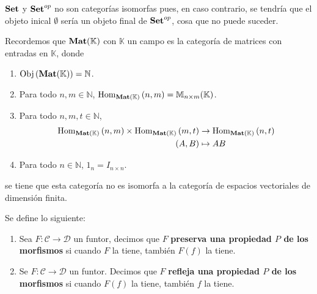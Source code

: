 \documentclass[12pt]{report}
\newcounter{it}
\theoremstyle{largebreak}
\newcommand\cf[3]{\ensuremath{#1:#2\rightarrow#3}}
\newcommand{\Obj}[1]{\ensuremath{\textup{Obj}\left(#1\right)}}
\newcommand{\Hom}[3]{\ensuremath{\textup{Hom}_{#1}\left(#2,#3\right)}}
\newcommand{\Cat}[1]{\ensuremath{\textup{\textbf{#1}}}}
\begin{document}
    \begin{exa}
        $\Cat{Set}$ y $\Cat{Set}^{op}$ no son categorías isomorfas pues, en caso contrario, se tendría que el objeto inical $\emptyset$ sería un objeto final de $\Cat{Set}^{op}$, cosa que no puede suceder.
    \end{exa}

    \begin{exa}
        Recordemos que $\Cat{Mat}(\mathbb{K})$ con $\mathbb{K}$ un campo es la categoría de matrices con entradas en $\mathbb{K}$, donde
        \begin{enumerate}
            \item $\Obj{\Cat{Mat}(\mathbb{K})}=\mathbb{N}$.
            \item Para todo $n,m\in\mathbb{N}$, $\Hom{\Cat{Mat}(\mathbb{K})}{n}{m}=\mathbb{M}_{ n\times m}(\mathbb{K})$.
            \item Para todo $n,m,t\in\mathbb{N}$,
            \begin{equation*}
                \begin{split}
                    \Hom{\Cat{Mat}(\mathbb{K})}{n}{m}\times\Hom{\Cat{Mat}(\mathbb{K})}{m}{t}&\rightarrow\Hom{\Cat{Mat}(\mathbb{K})}{n}{t}\\
                    (A,B)&\mapsto AB
                \end{split}
            \end{equation*}
            \item Para todo $n\in\mathbb{N}$, $1_n=I_{n\times n}$.
        \end{enumerate}
        se tiene que esta categoría no es isomorfa a la categoría de espacios vectoriales de dimensión finita.
    \end{exa}

    \begin{mydef}
        Se define lo siguiente:
        \begin{enumerate}
            \item Sea $\cf{F}{\mathcal{C}}{\mathcal{D}}$ un funtor, decimos que $F$ \textbf{ preserva una propiedad $P$ de los morfismos} si cuando $F$ la tiene, también $F(f)$ la tiene.
            \item Se $\cf{F}{\mathcal{C}}{\mathcal{D}}$ un funtor. Decimos que $F$ \textbf{refleja una propiedad $P$ de los morfismos} si cuando $F(f)$ la tiene, también $f$ la tiene.
        \end{enumerate}
    \end{mydef}
\end{document}
